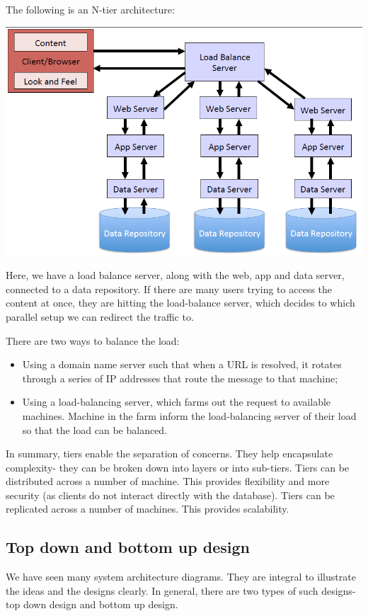 \documentclass[a4paper, openany]{memoir}
\begin{document}
The following is an N-tier architecture:
\begin{center}
    \includegraphics[scale=0.5]{src/L8I2.PNG}
\end{center}
Here, we have a load balance server, along with the web, app and data server, connected to a data repository. If there are many users trying to access the content at once, they are hitting the load-balance server, which decides to which parallel setup we can redirect the traffic to.

There are two ways to balance the load:
\begin{itemize}
    \item Using a domain name server such that when a URL is resolved, it rotates through a series of IP addresses that route the message to that machine;
    \item Using a load-balancing server, which farms out the request to available machines. Machine in the farm inform the load-balancing server of their load so that the load can be balanced.
\end{itemize}

In summary, tiers enable the separation of concerns. They help encapsulate complexity- they can be broken down into layers or into sub-tiers. Tiers can be distributed across a number of machine. This provides flexibility and more security (as clients do not interact directly with the database). Tiers can be replicated across a number of machines. This provides scalability.

\subsection{Top down and bottom up design}
We have seen many system architecture diagrams. They are integral to illustrate the ideas and the designs clearly. In general, there are two types of such designs- top down design and bottom up design.
\end{document}
